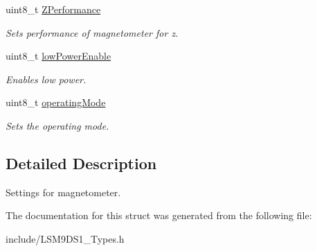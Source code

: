 \begin{DoxyCompactItemize}
\mbox{\label{structmagSettings_a0ab41f0670a3fd20ce1a43332f6fe949}} 
uint8\+\_\+t \hyperlink{structmagSettings_a0ab41f0670a3fd20ce1a43332f6fe949}{Z\+Performance}
\begin{DoxyCompactList}\small\item\em Sets performance of magnetometer for z. \end{DoxyCompactList}\item 
\mbox{\label{structmagSettings_abd59df268c0798fceacea68b956009df}} 
uint8\+\_\+t \hyperlink{structmagSettings_abd59df268c0798fceacea68b956009df}{low\+Power\+Enable}
\begin{DoxyCompactList}\small\item\em Enables low power. \end{DoxyCompactList}\item 
\mbox{\label{structmagSettings_ae3f0044de2fbdff6d7b830c36f26c450}} 
uint8\+\_\+t \hyperlink{structmagSettings_ae3f0044de2fbdff6d7b830c36f26c450}{operating\+Mode}
\begin{DoxyCompactList}\small\item\em Sets the operating mode. \end{DoxyCompactList}\end{DoxyCompactItemize}


\subsection{Detailed Description}
Settings for magnetometer. 

The documentation for this struct was generated from the following file\+:\begin{DoxyCompactItemize}
\item 
include/L\+S\+M9\+D\+S1\+\_\+\+Types.\+h\end{DoxyCompactItemize}
